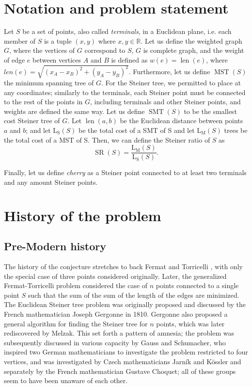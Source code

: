 \documentclass{mpaper}
\begin{document}
\section{Notation and problem statement}\label{sec:not}

Let $S$ be a set of points, also called \emph{terminals}, in a Euclidean plane, i.e. each member of $S$ is a tuple $(x,y)$ where $x,y\in\mathbb{R}$. Let us define the weighted graph $G$, where the vertices of $G$ correspond to $S$, $G$ is complete graph, and the weight of edge $e$ between vertices $A$ and $B$ is defined as $w(e)=\operatorname{len}(e)$, where $len(e) = \sqrt{(x_A-x_B)^2+(y_A-y_B)^2}$. Furthermore, let us define $\operatorname{MST}(S)$ the minimum spanning tree of $G$. For the Steiner tree, we permitted to place at any coordinates; similarly to the terminals, each Steiner point must be connected to the rest of the points in $G$, including terminals and other Steiner points, and weights are defined the same way. Let us define $\operatorname{SMT}(S)$ to be the smallest cost Steiner tree of $G$. 
Let $\operatorname{len}(a,b)$ be the Euclidean distance between points $a$ and $b$; and let $\operatorname{L_S}(S)$ be the total cost of a SMT of S and let $\operatorname{L_M}(S)$ trees be the total cost of a MST of S.  Then, we can define the Steiner ratio of $S$ as
$$\operatorname{SR}(S)=\frac{\operatorname{L_M}(S)}{\operatorname{L_S}(S)}.$$


Finally, let us define \emph{cherry} as a Steiner point connected to at least two terminals and any amount Steiner points.


\section{History of the problem}\label{sec:bg}
\subsection{Pre-Modern history}

The history of the conjecture stretches to back Fermat and Torricelli \cite{Brazil2014}, with only the special case of three points considered originally. Later, the generalized Fermat-Torricelli problem considered the case of $n$ points connected to a single point $S$ such that the sum of the sum of the length of the edges are minimized. The Euclidean Steiner tree problem was originally proposed and discussed by  the French mathematician Joseph Gergonne in 1810. Gergonne also proposed a general algorithm for finding the Steiner tree for $n$ points, which was later rediscovered by Melzak. This set forth a pattern of amnesia; the problem was subsequently discussed in various capacity by Gauss and Schumacher, who inspired two German mathematicians to investigate the problem restricted to four vertices, and was investigated by Czech mathematicians Jarník and Kössler and separately by the French mathematician Gustave Choquet; all of these groups seem to have been unaware of each other.
\end{document}
